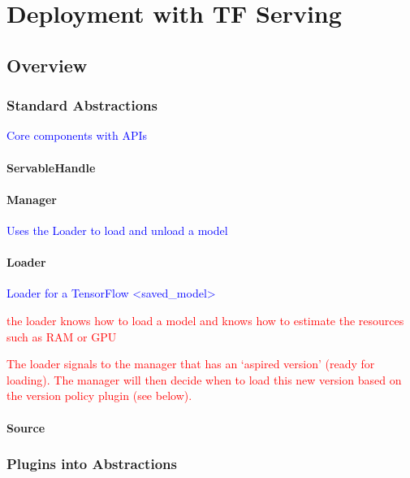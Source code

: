 \section{Deployment with TF Serving}

\subsection{Overview}

\subsubsection{Standard Abstractions}

\textcolor{blue}{Core components with APIs}

\paragraph{ServableHandle}

\paragraph{Manager}

\textcolor{blue}{Uses the Loader to load and unload a model}

\paragraph{Loader}

\textcolor{blue}{Loader for a TensorFlow <saved\_model>}

\textcolor{red}{the loader knows how to load a model and knows how to estimate the resources such as RAM or GPU}

\textcolor{red}{The loader signals to the manager that has an `aspired version' (ready for loading). The manager will then decide when to load this new version based on the version policy plugin (see below).}

\paragraph{Source}


\subsubsection{Plugins into Abstractions}


